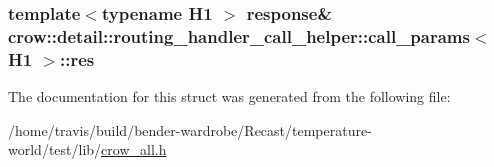 \hypertarget{structcrow_1_1detail_1_1routing__handler__call__helper_1_1call__params_ad63d6c1902dab21178b1b2644ec0d407}{
\subsubsection[{res}]{\setlength{\rightskip}{0pt plus 5cm}template$<$typename H1 $>$ {\bf response}\& {\bf crow\-::detail\-::routing\-\_\-handler\-\_\-call\-\_\-helper\-::call\-\_\-params}$<$ H1 $>$\-::res}}\label{structcrow_1_1detail_1_1routing__handler__call__helper_1_1call__params_ad63d6c1902dab21178b1b2644ec0d407}


The documentation for this struct was generated from the following file\-:\begin{DoxyCompactItemize}
\item 
/home/travis/build/bender-\/wardrobe/\-Recast/temperature-\/world/test/lib/\hyperlink{crow__all_8h}{crow\-\_\-all.\-h}\end{DoxyCompactItemize}
